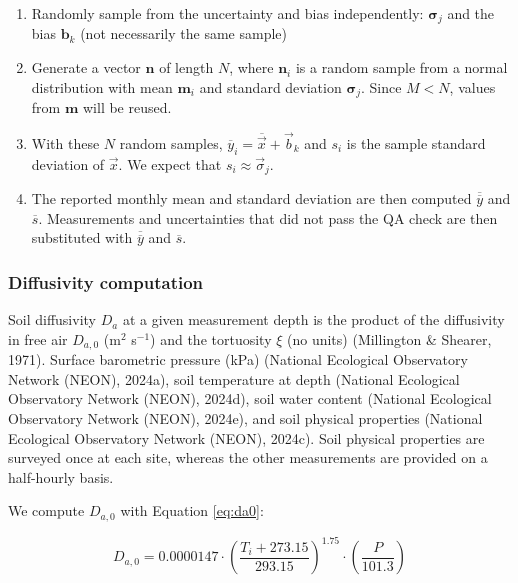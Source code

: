 \documentclass[
  letterpaper,
  DIV=11,
  numbers=noendperiod]{scrartcl}
\providecommand{\tightlist}{%
  \setlength{\itemsep}{0pt}\setlength{\parskip}{0pt}}\usepackage{longtable,booktabs,array}
\begin{document}
\begin{enumerate}
\def\labelenumi{\arabic{enumi}.}
\tightlist
\item
  Randomly sample from the uncertainty and bias independently:
  \(\boldsymbol\sigma_{j}\) and the bias \(\mathbf{b}_{k}\) (not
  necessarily the same sample)
\item
  Generate a vector \(\mathbf{n}\) of length \(N\), where
  \(\mathbf{n}_{i}\) is a random sample from a normal distribution with
  mean \(\boldsymbol{m}_{i}\) and standard deviation
  \(\boldsymbol\sigma_{j}\). Since \(M<N\), values from \(\mathbf{m}\)
  will be reused.
\item
  With these \(N\) random samples,
  \(\overline{y}_{i}=\overline{\vec{x}}+\vec{b}_{k}\) and \(s_{i}\) is
  the sample standard deviation of \(\vec{x}\). We expect that
  \(s_{i} \approx \vec{\sigma}_{j}\).
\item
  The reported monthly mean and standard deviation are then computed
  \(\overline{\overline{y}}\) and \(\overline{s}\). Measurements and
  uncertainties that did not pass the QA check are then substituted with
  \(\overline{\overline{y}}\) and \(\overline{s}\).
\end{enumerate}

\subsubsection{Diffusivity computation}\label{sec-compute-diffusivity}

Soil diffusivity \(D_{a}\) at a given measurement depth is the product
of the diffusivity in free air \(D_{a,0}\) (m\(^{2}\) s\(^{-1}\)) and
the tortuosity \(\xi\) (no units) (Millington \& Shearer, 1971). Surface
barometric pressure (kPa) (National Ecological Observatory Network
(NEON), 2024a), soil temperature at depth (National Ecological
Observatory Network (NEON), 2024d), soil water content (National
Ecological Observatory Network (NEON), 2024e), and soil physical
properties (National Ecological Observatory Network (NEON), 2024c). Soil
physical properties are surveyed once at each site, whereas the other
measurements are provided on a half-hourly basis.

We compute \(D_{a,0}\) with Equation \ref{eq:da0}:

\begin{equation}
  D_{a,0} = 0.0000147 \cdot \left( \frac{T_{i} + 273.15}{293.15} \right)^{1.75} \cdot \left( \frac{P}{101.3} \right)
  \label{eq:da0}
\end{equation}
\end{document}
